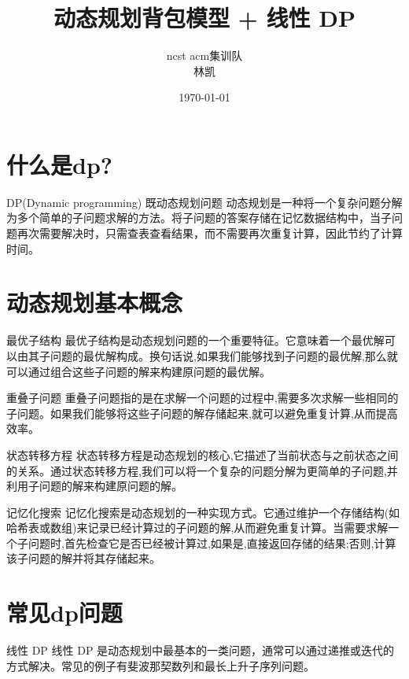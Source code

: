 \documentclass{beamer}
\title{动态规划背包模型 + 线性 DP}
\author{ncst acm集训队\\ 林凯}
\date{\today}
\begin{document}
\frame{\titlepage}

\section{什么是dp?}

\begin{frame}{DP(Dynamic programming) 既动态规划问题}
    动态规划是一种将一个复杂问题分解为多个简单的子问题求解的方法。将子问题的答案存储在记忆数据结构中，当子问题再次需要解决时，只需查表查看结果，而不需要再次重复计算，因此节约了计算时间。
\end{frame}

\section{动态规划基本概念}

\begin{frame}{最优子结构}
    最优子结构是动态规划问题的一个重要特征。它意味着一个最优解可以由其子问题的最优解构成。换句话说,如果我们能够找到子问题的最优解,那么就可以通过组合这些子问题的解来构建原问题的最优解。
\end{frame}

\begin{frame}{重叠子问题}
    重叠子问题指的是在求解一个问题的过程中,需要多次求解一些相同的子问题。如果我们能够将这些子问题的解存储起来,就可以避免重复计算,从而提高效率。
\end{frame}

\begin{frame}{状态转移方程}
    状态转移方程是动态规划的核心,它描述了当前状态与之前状态之间的关系。通过状态转移方程,我们可以将一个复杂的问题分解为更简单的子问题,并利用子问题的解来构建原问题的解。
\end{frame}

\begin{frame}{记忆化搜索}
    记忆化搜索是动态规划的一种实现方式。它通过维护一个存储结构(如哈希表或数组)来记录已经计算过的子问题的解,从而避免重复计算。当需要求解一个子问题时,首先检查它是否已经被计算过,如果是,直接返回存储的结果;否则,计算该子问题的解并将其存储起来。
\end{frame}

\section{常见dp问题}

\begin{frame}{线性 DP}
    线性 DP 是动态规划中最基本的一类问题，通常可以通过递推或迭代的方式解决。常见的例子有斐波那契数列和最长上升子序列问题。
\end{frame}
\end{document}
